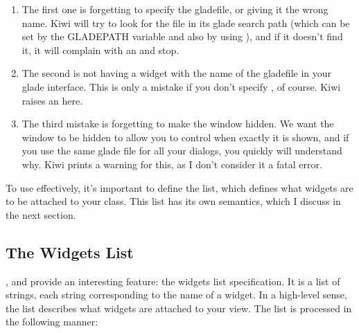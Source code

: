 \documentclass[a4paper]{howto}
\begin{document}
\begin{enumerate}
\item The first one is forgetting to specify the gladefile, or giving it
the wrong name. Kiwi will try to look for the file in its glade search
path (which can be set by the GLADEPATH variable and also by using
), and if it doesn't find it, it will
complain with an  and stop.
\item The second is not having a widget with the name of the gladefile
in your glade interface. This is only a mistake if you don't specify
, of course. Kiwi raises an
 here.
\item The third mistake is forgetting to make the window hidden. We want
the window to be hidden to allow you to control when exactly it is
shown, and if you use the same glade file for all your dialogs, you
quickly will understand why. Kiwi prints a warning for this, as I
don't consider it a fatal error.
\end{enumerate}

To use  effectively, it's important to define the
 list, which defines what widgets are to be attached to
your class. This list has its own semantics, which I discuss in the next
section.

\subsection{The Widgets List}

,  and  provide an
interesting feature: the widgets list specification. It is a list of
strings, each string corresponding to the name of a widget. In a
high-level sense, the list describes what widgets are attached to your
view. The list is processed in the following manner:
\end{document}

